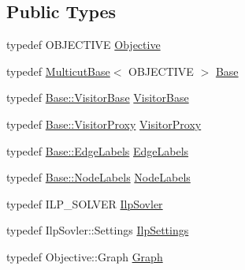 \subsection*{Public Types}
\begin{DoxyCompactItemize}
\item 
typedef O\+B\+J\+E\+C\+T\+I\+V\+E \hyperlink{classnifty_1_1graph_1_1optimization_1_1multicut_1_1MulticutIlp_a1c9fe5899608fc9c8e32bde6648c8278}{Objective}
\item 
typedef \hyperlink{classnifty_1_1graph_1_1MulticutBase}{Multicut\+Base}$<$ O\+B\+J\+E\+C\+T\+I\+V\+E $>$ \hyperlink{classnifty_1_1graph_1_1optimization_1_1multicut_1_1MulticutIlp_acf2fdd623f396ac26bcb15941759eb5a}{Base}
\item 
typedef \hyperlink{classnifty_1_1graph_1_1MulticutBase_a5882fb69df59d8113f6a81a0dac26eaa}{Base\+::\+Visitor\+Base} \hyperlink{classnifty_1_1graph_1_1optimization_1_1multicut_1_1MulticutIlp_a0dd77b07238eb761a1db58b058c0186c}{Visitor\+Base}
\item 
typedef \hyperlink{classnifty_1_1graph_1_1MulticutBase_a6ede271a3cb0ae4711a7e9da2b07efa9}{Base\+::\+Visitor\+Proxy} \hyperlink{classnifty_1_1graph_1_1optimization_1_1multicut_1_1MulticutIlp_ab78a646c0aea8aa633ff7155f349d7a6}{Visitor\+Proxy}
\item 
typedef \hyperlink{classnifty_1_1graph_1_1MulticutBase_aaeefe3c5df81d9c9efffec878cf2fcd7}{Base\+::\+Edge\+Labels} \hyperlink{classnifty_1_1graph_1_1optimization_1_1multicut_1_1MulticutIlp_a9cc10a30e26cda8cdf4eab873f70fcd2}{Edge\+Labels}
\item 
typedef \hyperlink{classnifty_1_1graph_1_1MulticutBase_afba61ad2919d0fad20b3745af19309da}{Base\+::\+Node\+Labels} \hyperlink{classnifty_1_1graph_1_1optimization_1_1multicut_1_1MulticutIlp_a0b5224bc8998dda829c920e8d3338fee}{Node\+Labels}
\item 
typedef I\+L\+P\+\_\+\+S\+O\+L\+V\+E\+R \hyperlink{classnifty_1_1graph_1_1optimization_1_1multicut_1_1MulticutIlp_ac85f089fd12431bd80f33c83dd45bdc7}{Ilp\+Sovler}
\item 
typedef Ilp\+Sovler\+::\+Settings \hyperlink{classnifty_1_1graph_1_1optimization_1_1multicut_1_1MulticutIlp_a61b515766e63459084d16525e62c527d}{Ilp\+Settings}
\item 
typedef Objective\+::\+Graph \hyperlink{classnifty_1_1graph_1_1optimization_1_1multicut_1_1MulticutIlp_a98f6b00c67ccecf9e2c5ad63d8d2bade}{Graph}
\end{DoxyCompactItemize}
